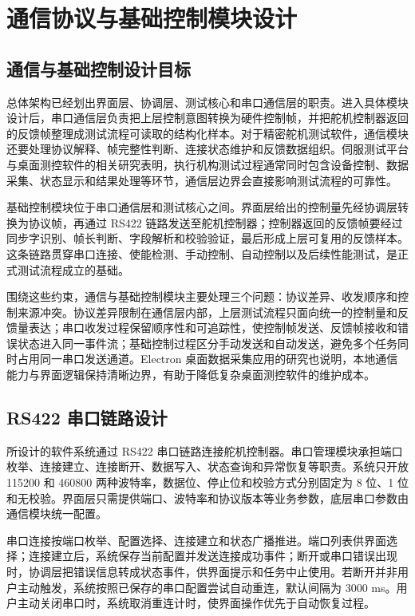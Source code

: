 \chapter{通信协议与基础控制模块设计}

\section{通信与基础控制设计目标}

总体架构已经划出界面层、协调层、测试核心和串口通信层的职责。进入具体模块设计后，串口通信层负责把上层控制意图转换为硬件控制帧，并把舵机控制器返回的反馈帧整理成测试流程可读取的结构化样本。对于精密舵机测试软件，通信模块还要处理协议解释、帧完整性判断、连接状态维护和反馈数据组织。伺服测试平台与桌面测控软件的相关研究表明，执行机构测试过程通常同时包含设备控制、数据采集、状态显示和结果处理等环节，通信层边界会直接影响测试流程的可靠性\cite{li2014servotest,zhang2017qtflowmeter}。

基础控制模块位于串口通信层和测试核心之间。界面层给出的控制量先经协调层转换为协议帧，再通过 RS422 链路发送至舵机控制器；控制器返回的反馈帧要经过同步字识别、帧长判断、字段解析和校验验证，最后形成上层可复用的反馈样本。这条链路贯穿串口连接、使能检测、手动控制、自动控制以及后续性能测试，是正式测试流程成立的基础。

围绕这些约束，通信与基础控制模块主要处理三个问题：协议差异、收发顺序和控制来源冲突。协议差异限制在通信层内部，上层测试流程只面向统一的控制量和反馈量表达；串口收发过程保留顺序性和可追踪性，使控制帧发送、反馈帧接收和错误状态进入同一事件流；基础控制过程区分手动发送和自动发送，避免多个任务同时占用同一串口发送通道。Electron 桌面数据采集应用的研究也说明，本地通信能力与界面逻辑保持清晰边界，有助于降低复杂桌面测控软件的维护成本\cite{gao2025electron}。

\section{RS422 串口链路设计}

所设计的软件系统通过 RS422 串口链路连接舵机控制器。串口管理模块承担端口枚举、连接建立、连接断开、数据写入、状态查询和异常恢复等职责。系统只开放 115200 和 460800 两种波特率，数据位、停止位和校验方式分别固定为 8 位、1 位和无校验。界面层只需提供端口、波特率和协议版本等业务参数，底层串口参数由通信模块统一配置。

串口连接按端口枚举、配置选择、连接建立和状态广播推进。端口列表供界面选择；连接建立后，系统保存当前配置并发送连接成功事件；断开或串口错误出现时，协调层把错误信息转成状态事件，供界面提示和任务中止使用。若断开并非用户主动触发，系统按照已保存的串口配置尝试自动重连，默认间隔为 3000 ms。用户主动关闭串口时，系统取消重连计时，使界面操作优先于自动恢复过程。

